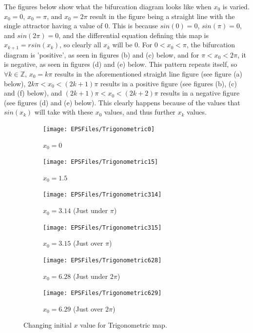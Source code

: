 \documentclass[a4wide, 10pt]{article}
\begin{document}
The figures below show what the bifurcation diagram looks like when $x_{0}$ is varied. $x_{0} = 0$,
 $x_{0} = \pi$, and $x_{0} = 2\pi$ result in the figure being a straight line with the single attractor
  having a value of 0. This is because $sin(0) = 0$, $sin(\pi) = 0$, and $sin(2\pi) = 0$, and the
   differential equation defining this map is $x_{k+1} = rsin(x_{k})$, so clearly all $x_{k}$ will be
    0. For $0 < x_{0} < \pi$, the bifurcation diagram is 'positive', as seen in figures (b) and (c)
     below, and for $\pi < x_{0} < 2\pi$, it is negative, as seen in figures (d) and (e) below. This
      pattern repeats itself, so $\forall k \in \mathbb{Z}$, $x_{0} = k\pi$ results in the
       aforementioned straight line figure (see figure (a) below), $2k\pi < x_{0} < (2k + 1)\pi$
        results in a positive figure (see figures (b), (c) and (f) below), and $(2k + 1)\pi < x_{0} <
         (2k + 2)\pi$ results in a negative figure (see figures (d) and (e) below). This clearly
          happens because of the values that $sin(x_{k})$ will take with these $x_{0}$ values, and thus
           further $x_{k}$ values.

\begin{figure}[H]
        \centering
        \begin{subfigure}[b]{0.25\textwidth}
                \texttt{[image: EPSFiles/Trigonometric0]}
                \caption{$x_{0} = 0$}
        \end{subfigure}
        \begin{subfigure}[b]{0.25\textwidth}
                \texttt{[image: EPSFiles/Trigonometric15]}
                \caption{$x_{0} = 1.5$}
        \end{subfigure}
        \begin{subfigure}[b]{0.25\textwidth}
                \texttt{[image: EPSFiles/Trigonometric314]}
                \caption{$x_{0} = 3.14$ (Just under $\pi$)}
        \end{subfigure}
        
        \begin{subfigure}[b]{0.25\textwidth}
                \texttt{[image: EPSFiles/Trigonometric315]}
                \caption{$x_{0} = 3.15$ (Just over $\pi$)}
        \end{subfigure}
        \begin{subfigure}[b]{0.25\textwidth}
                \texttt{[image: EPSFiles/Trigonometric628]}
                \caption{$x_{0} = 6.28$ (Just under $2 \pi$)}
        \end{subfigure}  
        \begin{subfigure}[b]{0.25\textwidth}
                \texttt{[image: EPSFiles/Trigonometric629]}
                \caption{$x_{0} = 6.29$ (Just over $2 \pi$)}
        \end{subfigure}  
        \caption{Changing initial $x$ value for Trigonometric map.}
\end{figure}
\end{document}
